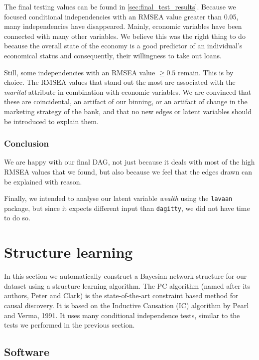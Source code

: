 \documentclass[11pt,]{article}
\begin{document}
\begin{multicols}{2}
The final testing values can be found in
\autoref{sec:final_test_results}. Because we focused conditional
independencies with an RMSEA value greater than 0.05, many
independencies have disappeared. Mainly, economic variables have been
connected with many other variables. We believe this was the right thing
to do because the overall state of the economy is a good predictor of an
individual's economical status and consequently, their willingness to
take out loans.

Still, some independencies with an RMSEA value \(\ge 0.5\) remain. This
is by choice. The RMSEA values that stand out the most are associated
with the \textit{marital} attribute in combination with economic
variables. We are convinced that these are coincidental, an artifact of
our binning, or an artifact of change in the marketing strategy of the
bank, and that no new edges or latent variables should be introduced to
explain them.

\hypertarget{conclusion}{%
\subsubsection{Conclusion}\label{conclusion}}

We are happy with our final DAG, not just because it deals with most of
the high RMSEA values that we found, but also because we feel that the
edges drawn can be explained with reason.

Finally, we intended to analyse our latent variable \textit{wealth}
using the \texttt{lavaan} package, but since it expects different input
than \texttt{dagitty}, we did not have time to do so.

\hypertarget{structure-learning}{%
\section{Structure learning}\label{structure-learning}}

In this section we automatically construct a Bayesian network structure
for our dataset using a structure learning algorithm. The PC algorithm
(named after its authors, Peter and Clark) is the state-of-the-art
constraint based method for causal discovery. It is based on the
Inductive Causation (IC) algorithm by Pearl and Verma, 1991. It uses
many conditional independence tests, similar to the tests we performed
in the previous section.

\hypertarget{software}{%
\subsection{Software}\label{software}}


\end{multicols}
\end{document}
